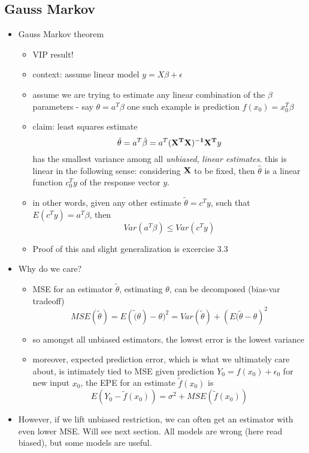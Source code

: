 \documentclass[a4paper]{report}
\newcommand{\blue}{\color{blue}}
\newcommand{\<}{\textless}
\renewcommand{\>}{\textgreater}
\begin{document}
\subsection{Gauss Markov}
 \begin{itemize}
 \item {\blue Gauss Markov theorem}
   \begin{itemize}
     \item VIP result!
     \item context: assume linear model $ y = X\beta + \epsilon$
     \item assume we are trying to estimate any linear combination of the $\beta$ parameters - say $\theta = a^T\beta$
       \subitem one such example is prediction $f(x_0) = x_0^T\beta$
     \item claim: least squares estimate 
       $$ \hat{\theta} = a^T \hat{\beta} = a^T {\bf (X^TX)^{-1}X^T}y $$
       has the smallest variance among all \emph{unbiased}, \emph{linear estimates}.
       \subitem this is linear in the following sense: considering ${\bf X}$ to be fixed, then $\hat{\theta}$ is a linear function $c_0^Ty$ of the response vector $y$.
     \item in other words, given any other estimate $\tilde{\theta} = c^Ty$, such that $E(c^Ty) = a^T\beta$, then
       $$ Var(a^T\beta) \leq Var(c^Ty) $$
     \item Proof of this and slight generalization is excercise 3.3
   \end{itemize}
 \item Why do we care?
   \begin{itemize}
     \item MSE for an estimator $\tilde{\theta}$, estimating $\theta$, can be decomposed (bias-var tradeoff)
       $$ MSE(\tilde{\theta}) = E(\tilde(\theta) - \theta)^2 = Var(\tilde{\theta}) + \left(E(\tilde{\theta} - \theta\right)^2 $$
       \item so amongst all unbiased estimators, the lowest error is the lowest variance
       \item moreover, expected prediction error, which is what we ultimately care about, is intimately tied to MSE
	 \subitem given prediction $Y_0 = f(x_0) + \epsilon_0$ for new input $x_0$, the EPE for an estimate $\tilde{f}(x_0)$ is
	 $$ E(Y_0 - \tilde{f}(x_0)) = \sigma^2 + MSE(\tilde{f}(x_0)) $$
   \end{itemize}
 \item However, if we lift unbiased restriction, we can often get an estimator with even lower MSE. Will see next section.
   \subitem All models are wrong (here read biased), but some models are useful.
\end{itemize}
\end{document}
